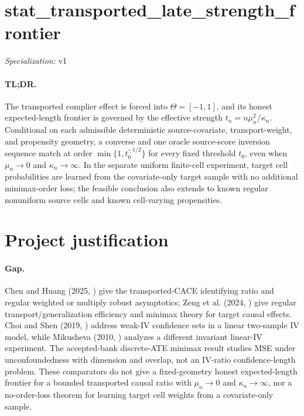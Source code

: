 \documentclass{article}
\begin{document}
\sloppy

\section*{stat\_\allowbreak{}transported\_\allowbreak{}late\_\allowbreak{}strength\_\allowbreak{}frontier}

\noindent\textit{Specialization:} v1\par

\paragraph{TL;DR.} The transported complier effect is forced into \(\Theta=[-1,1]\), and its honest expected-length frontier is governed by the effective strength \(t_n=n\mu_n^2/\kappa_n\).  Conditional on each admissible deterministic source-covariate, transport-weight, and propensity geometry, a converse and one oracle source-score inversion sequence match at order \(\min\{1,t_0^{-1/2}\}\) for every fixed threshold \(t_0\), even when \(\mu_n\to0\) and \(\kappa_n\to\infty\).  In the separate uniform finite-cell experiment, target cell probabilities are learned from the covariate-only target sample with no additional minimax-order loss; the feasible conclusion also extends to known regular nonuniform source cells and known cell-varying propensities.

\section{Project justification}

\paragraph{Gap.} Chen and Huang (2025, \cite{ChenHuang2025}) give the transported-CACE identifying ratio and regular weighted or multiply robust asymptotics; Zeng et al. (2024, \cite{ZengKennedyBodnarNaimi2024}) give regular transport/generalization efficiency and minimax theory for target causal effects. Choi and Shen (2019, \cite{ChoiShen2019}) address weak-IV confidence sets in a linear two-sample IV model, while Mikusheva (2010, \cite{Mikusheva2010}) analyzes a different invariant linear-IV experiment. The accepted-bank discrete-ATE minimax result studies MSE under unconfoundedness with dimension and overlap, not an IV-ratio confidence-length problem. These comparators do not give a fixed-geometry honest expected-length frontier for a bounded transported causal ratio with \(\mu_n\to0\) and \(\kappa_n\to\infty\), nor a no-order-loss theorem for learning target cell weights from a covariate-only sample.
\end{document}
